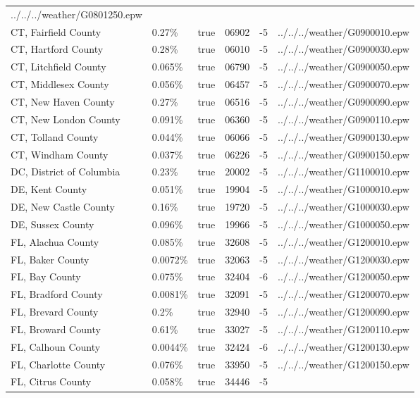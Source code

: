 \begin{longtable}[]{@{}llllll@{}}
../../../weather/G0801250.epw \\
CT, Fairfield County & 0.27\% & true & 06902 & -5 &
../../../weather/G0900010.epw \\
CT, Hartford County & 0.28\% & true & 06010 & -5 &
../../../weather/G0900030.epw \\
CT, Litchfield County & 0.065\% & true & 06790 & -5 &
../../../weather/G0900050.epw \\
CT, Middlesex County & 0.056\% & true & 06457 & -5 &
../../../weather/G0900070.epw \\
CT, New Haven County & 0.27\% & true & 06516 & -5 &
../../../weather/G0900090.epw \\
CT, New London County & 0.091\% & true & 06360 & -5 &
../../../weather/G0900110.epw \\
CT, Tolland County & 0.044\% & true & 06066 & -5 &
../../../weather/G0900130.epw \\
CT, Windham County & 0.037\% & true & 06226 & -5 &
../../../weather/G0900150.epw \\
DC, District of Columbia & 0.23\% & true & 20002 & -5 &
../../../weather/G1100010.epw \\
DE, Kent County & 0.051\% & true & 19904 & -5 &
../../../weather/G1000010.epw \\
DE, New Castle County & 0.16\% & true & 19720 & -5 &
../../../weather/G1000030.epw \\
DE, Sussex County & 0.096\% & true & 19966 & -5 &
../../../weather/G1000050.epw \\
FL, Alachua County & 0.085\% & true & 32608 & -5 &
../../../weather/G1200010.epw \\
FL, Baker County & 0.0072\% & true & 32063 & -5 &
../../../weather/G1200030.epw \\
FL, Bay County & 0.075\% & true & 32404 & -6 &
../../../weather/G1200050.epw \\
FL, Bradford County & 0.0081\% & true & 32091 & -5 &
../../../weather/G1200070.epw \\
FL, Brevard County & 0.2\% & true & 32940 & -5 &
../../../weather/G1200090.epw \\
FL, Broward County & 0.61\% & true & 33027 & -5 &
../../../weather/G1200110.epw \\
FL, Calhoun County & 0.0044\% & true & 32424 & -6 &
../../../weather/G1200130.epw \\
FL, Charlotte County & 0.076\% & true & 33950 & -5 &
../../../weather/G1200150.epw \\
FL, Citrus County & 0.058\% & true & 34446 & -5 &

\end{longtable}
